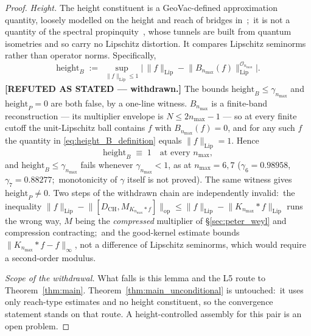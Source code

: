 \documentclass[11pt,a4paper]{article}
\theoremstyle{plain}
\theoremstyle{definition}
\newcommand{\nmax}{n_{\max}}
\newcommand{\Op}{\mathcal{O}}
\newcommand{\opnorm}[1]{\lVert #1 \rVert_{\mathrm{op}}}
\newcommand{\Lipnorm}[1]{\lVert #1 \rVert_{\mathrm{Lip}}}
\newcommand{\norm}[1]{\lVert #1 \rVert}
\newcommand{\Mat}{M}
\newcommand{\DCH}{D_{\mathrm{CH}}}
\newcommand{\KS}{K}
\begin{document}
\begin{proof}
\emph{Height.} The height constituent is a GeoVac-defined
approximation quantity, loosely modelled on the height and reach of
bridges in~\cite{latremoliere2016};\ it is not a quantity of the
spectral propinquity~\cite{latremoliere_metric_st_2017}, whose tunnels
are built from quantum isometries and so carry no Lipschitz distortion.
It compares Lipschitz seminorms rather than operator norms.
Specifically,
\begin{equation}\label{eq:height_B_definition}
   \mathrm{height}_B
   \;:=\; \sup_{\Lipnorm{f} \le 1}
   \bigl|\,\Lipnorm{f} - \Lipnorm{B_{\nmax}(f)}^{\Op_{\nmax}}\bigr|.
\end{equation}
\textbf{[REFUTED AS STATED --- withdrawn.]}  The bounds $\mathrm{height}_B \le
\gamma_{\nmax}$ and $\mathrm{height}_P = 0$ are both false, by a
one-line witness.  $B_{\nmax}$ is a finite-band reconstruction --- its
multiplier envelope is $N \le 2\nmax - 1$ --- so at every finite cutoff the
unit-Lipschitz ball contains $f$ with $B_{\nmax}(f) = 0$, and for any such $f$
the quantity in \eqref{eq:height_B_definition} equals $\Lipnorm{f} = 1$.
Hence
\begin{equation}\label{eq:height_identically_one}
   \mathrm{height}_B \;\equiv\; 1 \quad\text{at every } \nmax,
\end{equation}
and $\mathrm{height}_B \le \gamma_{\nmax}$ fails whenever $\gamma_{\nmax} < 1$,
as at $\nmax = 6, 7$ ($\gamma_6 = 0.98958$, $\gamma_7 = 0.88277$;\ monotonicity of $\gamma$ itself is not proved).
The same witness gives $\mathrm{height}_P \ne 0$.  Two steps of the withdrawn
chain are independently invalid:\ the inequality
$\Lipnorm{f} - \opnorm{[\DCH, \Mat_{\KS_{\nmax}*f}]} \le \Lipnorm{f} -
\Lipnorm{\KS_{\nmax}*f}$ runs the wrong way, $\Mat$ being the \emph{compressed}
multiplier of \S\ref{sec:peter_weyl} and compression contracting;\ and the
good-kernel estimate bounds $\norm{\KS_{\nmax}*f - f}_\infty$, not a difference
of Lipschitz seminorms, which would require a second-order modulus.

\emph{Scope of the withdrawal.}  What falls is this lemma and the L5 route to
Theorem~\ref{thm:main}.  Theorem~\ref{thm:main_unconditional} is untouched:\ it
uses only reach-type estimates and no height constituent, so the convergence
statement stands on that route.  A
height-controlled assembly for this pair is an open problem.


\end{proof}
\end{document}
